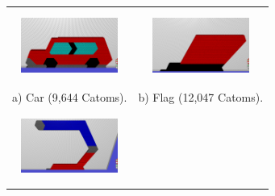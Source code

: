 {
	\newcommand{\mySubfigureWidth}{120px}
	\newcommand{\mySubfigureHeight}{90px}
	\begin{figure}[h!]
		\centering			
		\small
		\begin{tabular}{c c}
			\includegraphics[width=\mySubfigureWidth,height=\mySubfigureHeight]{images/reconfiguration/car-9644.png} & 	\includegraphics[width=\mySubfigureWidth,height=\mySubfigureHeight]{images/reconfiguration/flag-12407.png}\\
			a) Car (9,644 Catoms). & b) Flag (12,047 Catoms).\\
			\includegraphics[width=\mySubfigureWidth,height=\mySubfigureHeight]{images/reconfiguration/magnet-10220.png} &

\end{tabular}
\end{figure}}
